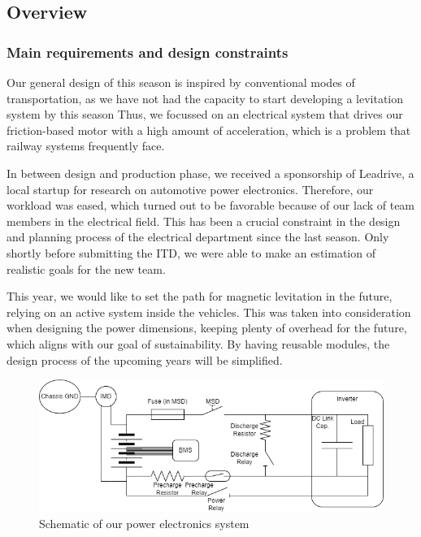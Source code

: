 \subsection{Overview}
\subsubsection*{Main requirements and design constraints}
\par Our general design of this season is inspired by conventional modes of transportation,
as we have not had the capacity to start developing a levitation system by this season
Thus, we focussed on an electrical system that drives our friction-based motor with
a high amount of acceleration, which is a problem that railway systems frequently face.

\par In between design and production phase, we received a sponsorship of Leadrive,
a local startup for research on automotive power electronics.
Therefore, our workload was eased, which turned out to be favorable
because of our lack of team members in the electrical field. This has been a crucial
constraint in the design and planning process of the electrical department
since the last season. Only shortly before submitting the ITD, we were able to make an estimation of
realistic goals for the new team.

\par This year, we would like to set the path for magnetic levitation in the future, relying on an active system
inside the vehicles. This was taken into consideration when designing the power dimensions,
keeping plenty of overhead for the future, which aligns with our goal of sustainability.
By having reusable modules, the design process of the upcoming years will be simplified.
\begin{figure}[ht]
    \centering
    \includegraphics[width=\linewidth]{texfiles/elec/eimg/HVSchematic}
    \caption{Schematic of our power electronics system}
    \label{fig:HVSchematic}
\end{figure}

